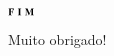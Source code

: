 \documentclass{beamer}%
\begin{document}
\begin{frame}
\Huge{\centerline{\bcnote \dotfill \bcclesol \dotfill$_{\mathbf{F}\ \mathbf{I}\ \mathbf{M}}$\dotfill \bcclefa \dotfill \bcnote}}

\begin{center}
\bctrefle Muito obrigado!\bctrefle
\end{center}
\end{frame}
\end{document}
